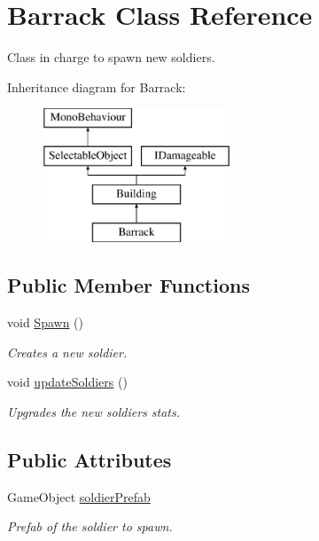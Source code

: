\hypertarget{class_barrack}{}\section{Barrack Class Reference}
\label{class_barrack}


Class in charge to spawn new soldiers.  


Inheritance diagram for Barrack\+:\begin{figure}[H]
\begin{center}
\leavevmode
\includegraphics[height=4.000000cm]{class_barrack}
\end{center}
\end{figure}
\subsection*{Public Member Functions}
\begin{DoxyCompactItemize}
\item 
void \mbox{\hyperlink{class_barrack_ac0496855ca1e379fc38fbb882b71c018}{Spawn}} ()
\begin{DoxyCompactList}\small\item\em Creates a new soldier. \end{DoxyCompactList}\item 
void \mbox{\hyperlink{class_barrack_ae71023bf7da489b81791d7e1582ba154}{update\+Soldiers}} ()
\begin{DoxyCompactList}\small\item\em Upgrades the new soldiers stats. \end{DoxyCompactList}\end{DoxyCompactItemize}
\subsection*{Public Attributes}
\begin{DoxyCompactItemize}
\item 
Game\+Object \mbox{\hyperlink{class_barrack_adf7be62f03920fd2248a35c598b92b2a}{soldier\+Prefab}}
\begin{DoxyCompactList}\small\item\em Prefab of the soldier to spawn. \end{DoxyCompactList}\end{DoxyCompactItemize}
